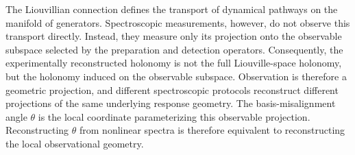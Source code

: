 \begin{tcolorbox}[
colback=gray!5,
colframe=black,
title=\textbf{Principle of Observational Holonomy},
fonttitle=\bfseries,
breakable]
The Liouvillian connection defines the transport of dynamical
pathways on the manifold of generators. Spectroscopic
measurements, however, do not observe this transport directly.
Instead, they measure only its projection onto the observable
subspace selected by the preparation and detection operators.
Consequently, the experimentally reconstructed holonomy is not
the full Liouville-space holonomy, but the holonomy induced on
the observable subspace. Observation is therefore a geometric
projection, and different spectroscopic protocols reconstruct
different projections of the same underlying response geometry.
The basis-misalignment angle $\theta$ is the local coordinate
parameterizing this observable projection. Reconstructing
$\theta$ from nonlinear spectra is therefore equivalent to
reconstructing the local observational geometry.
\end{tcolorbox}

